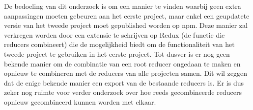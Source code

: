 De bedoeling van dit onderzoek is om een manier te vinden waarbij geen extra aanpassingen moeten gebeuren aan het eerste project, maar enkel een geupdatete versie van het tweede project moet gepublished worden op npm. Deze manier zal verkregen worden door een extensie te schrijven op Redux (de functie die reducers combineert) die de mogelijkheid biedt om de functionaliteit van het tweede project te gebruiken in het eerste project. Tot dusver is er nog geen bekende manier om de combinatie van een root reducer ongedaan te maken en opnieuw te combineren met de reducers van alle projecten samen. Dit wil zeggen dat de enige bekende manier een export van de bestaande reducers is. Er is dus zeker nog ruimte voor verder onderzoek over hoe reeds gecombineerde reducers opnieuw gecombineerd kunnen worden met elkaar.

